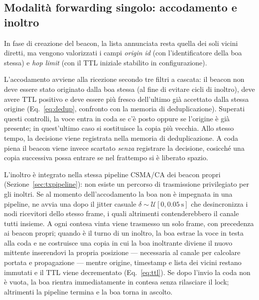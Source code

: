 \subsection{Modalit\`a forwarding singolo: accodamento e inoltro}
\label{sec:forward-impl}
In fase di creazione del beacon, la lista annunciata resta quella dei soli vicini diretti, ma
vengono valorizzati i campi \emph{origin id} (con l'identificatore della boa stessa) e
\emph{hop limit} (con il TTL iniziale stabilito in configurazione).

L'accodamento avviene alla ricezione secondo tre filtri a cascata: il
beacon non deve essere stato originato dalla boa stessa (al fine di evitare cicli di inoltro), 
deve avere TTL positivo e deve essere pi\`u fresco
dell'ultimo gi\`a accettato dalla stessa origine (Eq.~\ref{eq:dedup}, confronto con
la memoria di deduplicazione). Superati questi controlli, la voce entra in coda se c'\`e
posto oppure se l'origine \`e gi\`a presente; in quest'ultimo caso si sostituisce la copia pi\`u
vecchia. Allo stesso tempo, la decisione viene registrata nella memoria di
deduplicazione. A coda piena il beacon viene invece scartato \emph{senza} registrare
la decisione, cosicch\'e una copia successiva possa entrare se nel frattempo si \`e
liberato spazio.

L'inoltro \`e integrato nella stessa pipeline CSMA/CA dei beacon propri
(Sezione~\ref{sec:txpipeline}): non esiste un percorso di trasmissione privilegiato
per gli inoltri. Se al momento dell'accodamento la boa non \`e impegnata in una pipeline, ne
avvia una dopo il jitter casuale $\delta \sim \mathcal{U}[0, \SI{0.05}{\second}]$ che
desincronizza i nodi ricevitori dello stesso frame, i quali altrimenti
contenderebbero il canale tutti insieme. A ogni contesa vinta viene trasmesso un solo
frame, con precedenza ai beacon propri; quando \`e il turno di un inoltro, la boa
estrae la voce in testa alla coda e ne costruisce una copia
in cui la boa inoltrante diviene il nuovo mittente inserendovi la propria posizione ---
necessaria al canale per calcolare portata e propagazione --- mentre origine,
timestamp e lista dei vicini restano immutati e il TTL viene decrementato
(Eq.~\ref{eq:ttl}). Se dopo l'invio la coda non \`e vuota, la boa rientra
immediatamente in contesa senza rilasciare il lock; altrimenti la
pipeline termina e la boa torna in ascolto.

